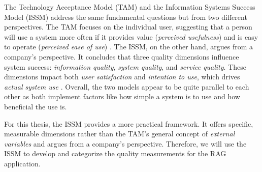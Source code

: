 \documentclass[
	english,
	ruledheaders=section,%
	class=report,%
	thesis={type=bachelor},%
	accentcolor=1b,%
	custommargins=true,%
	marginpar=false,%
	parskip=half-,%
	fontsize=11pt,%
	DIV=14,
]{tudapub}
\begin{document}
The Technology Acceptance Model (TAM) and the Information Systems Success Model (ISSM) address the same fundamental questions but from two different perspectives. The TAM focuses on the individual user, suggesting that a person will use a system more often if it provides value (\textit{perceived usefulness}) and is easy to operate (\textit{perceived ease of use}) \parencite[p.~320]{Davis1989}.
The ISSM, on the other hand, argues from a company's perspective. It concludes that three quality dimensions influence system success: \textit{information quality}, \textit{system quality}, and \textit{service quality}. These dimensions impact both \textit{user satisfaction} and \textit{ intention to use}, which drives \textit{actual system use} \parencite[pp.~22-23]{DeloneMcLean2003ISSuccessTenYearUpdate}. Overall, the two models appear to be quite parallel to each other as both implement factors like how simple a system is to use and how beneficial the use is.

For this thesis, the ISSM provides a more practical framework. It offers specific, measurable dimensions rather than the TAM's general concept of \textit{external variables} and argues from a company's perspective. Therefore, we will use the ISSM to develop and categorize the quality measurements for the RAG application.

\newpage
\end{document}
